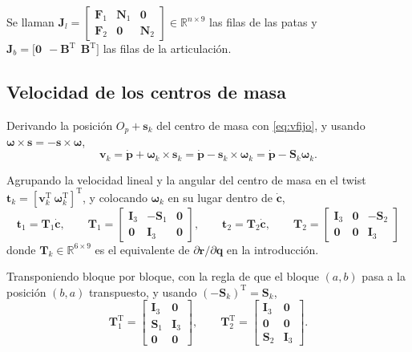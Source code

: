 \documentclass[11pt]{article}
\newcommand{\T}{^{\mathrm{T}}}
\newcommand{\pvec}{\mathbf{p}}
\newcommand{\Fmat}{\mathbf{F}}
\newcommand{\Nmat}{\mathbf{N}}
\newcommand{\wv}{\boldsymbol{\omega}}
\newcommand{\cd}{\dot{\mathbf{c}}}
\begin{document}
Se llaman $\mathbf{J}_l=\begin{bmatrix}\Fmat_1 & \Nmat_1 & \mathbf{0}\\ \Fmat_2 & \mathbf{0} & \Nmat_2\end{bmatrix}\in\mathbb{R}^{n\times9}$ las filas de las patas y $\mathbf{J}_b=\big[\mathbf{0}\ \ -\mathbf{B}\T\ \ \mathbf{B}\T\big]$ las filas de la articulación.

\subsection{Velocidad de los centros de masa}

Derivando la posición $O_p+\mathbf{s}_k$ del centro de masa con \eqref{eq:vfijo}, y usando $\wv\times\mathbf{s}=-\mathbf{s}\times\wv$,
\begin{equation}
\mathbf{v}_k=\dot{\pvec}+\wv_k\times\mathbf{s}_k=\dot{\pvec}-\mathbf{s}_k\times\wv_k=\dot{\pvec}-\mathbf{S}_k\wv_k .
\label{eq:vk}
\end{equation}

Agrupando la velocidad lineal y la angular del centro de masa en el twist $\mathbf{t}_k=[\mathbf{v}_k\T\ \wv_k\T]\T$, y colocando $\wv_k$ en su lugar dentro de $\cd$,
\begin{equation}
\boxed{\ \mathbf{t}_1=\mathbf{T}_1\cd,
\qquad
\mathbf{T}_1=
\begin{bmatrix}
\mathbf{I}_3 & -\mathbf{S}_1 & \mathbf{0}\\
\mathbf{0} & \mathbf{I}_3 & \mathbf{0}
\end{bmatrix},
\qquad
\mathbf{t}_2=\mathbf{T}_2\cd,
\qquad
\mathbf{T}_2=
\begin{bmatrix}
\mathbf{I}_3 & \mathbf{0} & -\mathbf{S}_2\\
\mathbf{0} & \mathbf{0} & \mathbf{I}_3
\end{bmatrix}\ }
\label{eq:Tk}
\end{equation}
donde $\mathbf{T}_k\in\mathbb{R}^{6\times9}$ es el equivalente de $\partial\mathbf{r}/\partial\mathbf{q}$ en la introducción.

Transponiendo bloque por bloque, con la regla de que el bloque $(a,b)$ pasa a la posición $(b,a)$ transpuesto, y usando $(-\mathbf{S}_k)\T=\mathbf{S}_k$,
\begin{equation}
\mathbf{T}_1\T=
\begin{bmatrix}
\mathbf{I}_3 & \mathbf{0}\\
\mathbf{S}_1 & \mathbf{I}_3\\
\mathbf{0} & \mathbf{0}
\end{bmatrix},
\qquad
\mathbf{T}_2\T=
\begin{bmatrix}
\mathbf{I}_3 & \mathbf{0}\\
\mathbf{0} & \mathbf{0}\\
\mathbf{S}_2 & \mathbf{I}_3
\end{bmatrix}.
\label{eq:TkT}
\end{equation}
\end{document}

